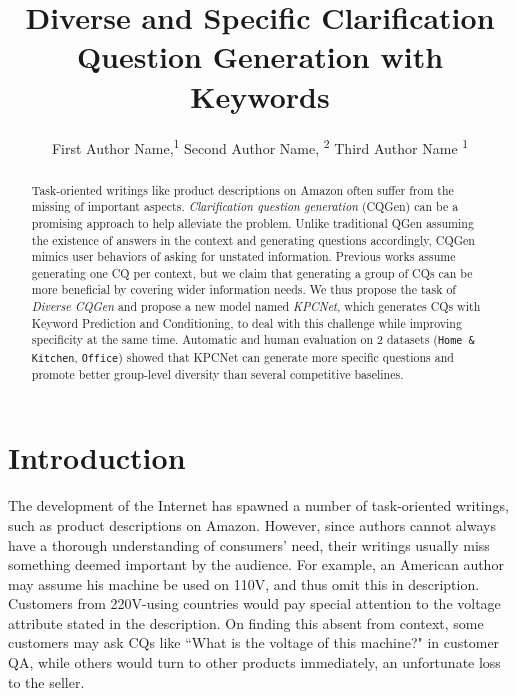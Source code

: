 \documentclass[letterpaper]{article} %
\title{Diverse and Specific Clarification Question Generation with Keywords}
\author {

        First Author Name,\textsuperscript{\rm 1}
        Second Author Name, \textsuperscript{\rm 2}
        Third Author Name \textsuperscript{\rm 1} \\
}
\begin{document}
\linenumbers
\maketitle

\begin{abstract}
  Task-oriented writings like product descriptions on Amazon often suffer from the missing of important aspects. \textit{Clarification question generation} (CQGen) can be a promising approach to help alleviate the problem. Unlike traditional QGen assuming the existence of answers in the context and generating questions accordingly, CQGen mimics user behaviors of asking for unstated information. Previous works assume generating one CQ per context, but we claim that generating a group of CQs can be more beneficial by covering wider information needs. We thus propose the task of \textit{Diverse CQGen} and propose a new model named \textit{KPCNet}, which generates CQs with Keyword Prediction and Conditioning, to deal with this challenge while improving specificity at the same time. Automatic and human evaluation on 2 datasets (\texttt{Home \& Kitchen}, \texttt{Office}) showed that KPCNet can generate more specific questions and promote better group-level diversity than several competitive baselines.
\end{abstract}

\section{Introduction}
\label{sec:intro}
The development of the Internet has spawned a number of task-oriented writings, such as product descriptions on Amazon. However, since authors cannot always have a thorough understanding of consumers' need, their writings usually miss something deemed important by the audience. For example, an American author may assume his machine be used on 110V, and thus omit this in description. Customers from 220V-using countries would pay special attention to the voltage attribute stated in the description. On finding this absent from context, some customers may ask CQs like ``What is the voltage of this machine?" in customer QA, while others would turn to other products immediately, an unfortunate loss to the seller.
\end{document}
